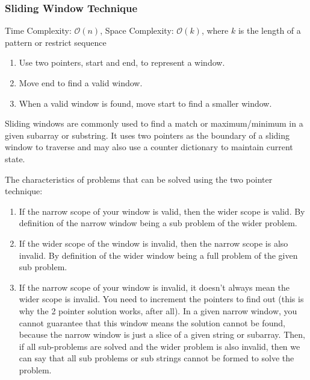 \documentclass{article}
\newcommand{\bigO}{\ensuremath{\mathcal{O}}}
\begin{document}
    \subsubsection{Sliding Window Technique}
    Time Complexity: $\bigO(n)$, Space Complexity: $\bigO(k)$, where $k$ is the length of a pattern or restrict sequence 
    
    \begin{enumerate}
        \item Use two pointers, start and end, to represent a window.
        \item Move end to find a valid window.
        \item When a valid window is found, move start to find a smaller window.
    \end{enumerate}
    
    Sliding windows are commonly used to find a match or maximum/minimum in a given subarray or substring. It uses two pointers as the boundary of a sliding window to traverse and may also use a counter dictionary to maintain current state.
    
    The characteristics of problems that can be solved using the two pointer technique:
    \begin{enumerate}
        \item If the narrow scope of your window is valid, then the wider scope is valid. By definition of the narrow window being a sub problem of the wider problem.
        \item If the wider scope of the window is invalid, then the narrow scope is also invalid. By definition of the wider window being a full problem of the given sub problem.
        \item If the narrow scope of your window is invalid, it doesn't always mean the wider scope is invalid. You need to increment the pointers to find out (this is why the 2 pointer solution works, after all). In a given narrow window, you cannot guarantee that this window means the solution cannot be found, because the narrow window is just a slice of a given string or subarray. Then, if all sub-problems are solved and the wider problem is also invalid, then we can say that all sub problems or sub strings cannot be formed to solve the problem.
    \end{enumerate}
\end{document}
